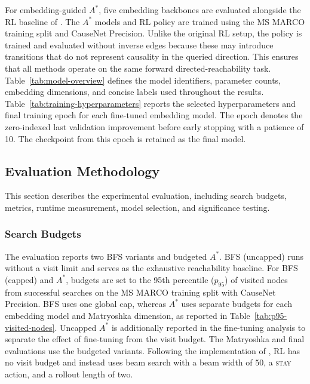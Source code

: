 For embedding-guided \(A^*\), five embedding backbones are evaluated alongside the RL baseline of \citet{bluebaum:2024}. The \(A^*\) models and RL policy are trained using the MS MARCO training split and CauseNet Precision. Unlike the original RL setup, the policy is trained and evaluated without inverse edges because these may introduce transitions that do not represent causality in the queried direction. This ensures that all methods operate on the same forward directed-reachability task. Table~\ref{tab:model-overview} defines the model identifiers, parameter counts, embedding dimensions, and concise labels used throughout the results. Table~\ref{tab:training-hyperparameters} reports the selected hyperparameters and final training epoch for each fine-tuned embedding model. The epoch denotes the zero-indexed last validation improvement before early stopping with a patience of 10. The checkpoint from this epoch is retained as the final model.





\subsection{Evaluation Methodology}
\label{sec:results-methodology}

This section describes the experimental evaluation, including search budgets, metrics, runtime measurement, model selection, and significance testing.

\subsubsection{Search Budgets}

The evaluation reports two BFS variants and budgeted \(A^*\). BFS (uncapped) runs without a visit limit and serves as the exhaustive reachability baseline. For BFS (capped) and \(A^*\), budgets are set to the 95th percentile ($p_{95}$) of visited nodes from successful searches on the MS MARCO training split with CauseNet Precision. BFS uses one global cap, whereas \(A^*\) uses separate budgets for each embedding model and Matryoshka dimension, as reported in Table~\ref{tab:p95-visited-nodes}. Uncapped \(A^*\) is additionally reported in the fine-tuning analysis to separate the effect of fine-tuning from the visit budget. The Matryoshka and final evaluations use the budgeted variants. Following the implementation of \citet{bluebaum:2024}, RL has no visit budget and instead uses beam search with a beam width of \(50\), a \textsc{stay} action, and a rollout length of two.


